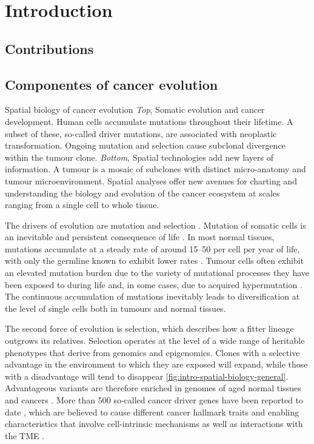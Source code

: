 \chapter{Introduction}

\section*{Contributions}

\section{Componentes of cancer evolution}

    {Spatial biology of cancer evolution \parencite{Seferbekova2023-wg}}
    {\emph{Top}, Somatic evolution and cancer development. Human cells accumulate mutations throughout their lifetime. A subset of these, so-called driver mutations, are associated with neoplastic transformation. Ongoing mutation and selection cause subclonal divergence within the tumour clone. \emph{Bottom}, Spatial technologies add new layers of information. A tumour is a mosaic of subclones with distinct micro-anatomy and tumour microenvironment. Spatial analyses offer new avenues for charting and understanding the biology and evolution of the cancer ecosystem at scales ranging from a single cell to whole tissue.}


The drivers of evolution are mutation and selection \parencite{Cairns1975-oz,Nowell1976-sm}. Mutation of somatic cells is an inevitable and persistent consequence of life \parencite{Martincorena2015-br, Moore2021-yr, Li2021-th}. In most normal tissues, mutations accumulate at a steady rate of around 15–50 per cell per year of life, with only the germline known to exhibit lower rates \parencite{Moore2021-yr}. Tumour cells often exhibit an elevated mutation burden due to the variety of mutational processes they have been exposed to during life and, in some cases, due to acquired hypermutation \parencite{Alexandrov2020-uo}. The continuous accumulation of mutations inevitably leads to diversification at the level of single cells both in tumours and normal tissues.

The second force of evolution is selection, which describes how a fitter lineage outgrows its relatives. Selection operates at the level of a wide range of heritable phenotypes that derive from genomics and epigenomics. Clones with a selective advantage in the environment to which they are exposed will expand, while those with a disadvantage will tend to disappear \cref{fig:intro-spatial-biology-general}. Advantageous variants are therefore enriched in genomes of aged normal tissues and cancers \parencite{Greenman2006-cx,Martincorena2017-uw}. More than 500 so-called cancer driver genes have been reported to date \parencite{Lawrence2013-mi,Gonzalez-Perez2013-vo,Sondka2018-xf}, which are believed to cause different cancer hallmark traits and enabling characteristics that involve cell-intrinsic mechanisms as well as interactions with the \ac{TME} \parencite{Hanahan2000-ze, Hanahan2022-eb}.

